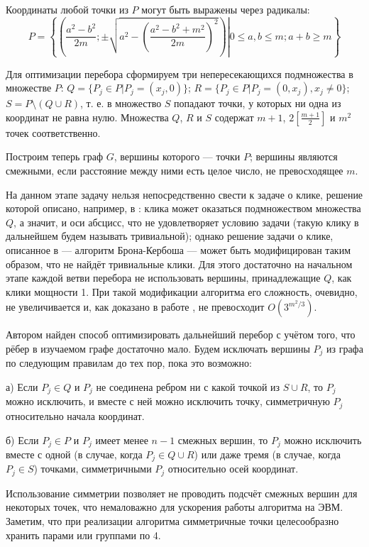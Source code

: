 \documentclass{article}
\begin{document}
Координаты любой точки из $P$ могут быть выражены через радикалы:
$$
	P = \left\{
		\left(\left.  \frac{a^2-b^2}{2m} ; \pm\sqrt{a^2  - \left( \frac{a^2-b^2+m^2}{2m}\right)^2}  \right)	\right| 0 \leq a, b \leq m ; a+b \geq m
	\right\}
$$


Для оптимизации перебора сформируем три непересекающихся подмножества в множестве $P$:
$Q = \{P_j \in P | P_j = (x_j, 0)\}$;
$R = \{P_j \in P | P_j = (0, x_j), x_j \neq 0\}$;
$S = P \setminus \left( Q \cup R\right)$,
т. е. в множество $S$ попадают точки, у которых ни одна из координат не равна нулю.
Множества $Q$, $R$ и $S$ содержат $m+1$, $2\left\lbrack\frac{m+1}{2}\right\rbrack$ и $m^2$ точек соответственно.

Построим теперь граф $G$, вершины которого --- точки $P$;
вершины являются смежными, если расстояние между ними есть целое число, не превосходящее $m$.

На данном этапе задачу нельзя непосредственно свести к задаче о клике, решение которой описано, например, в \cite{BronKerbosh}:
клика может оказаться подмножеством множества $Q$, а значит, и оси абсцисс, что не удовлетворяет условию задачи (такую клику в дальнейшем будем называть тривиальной);
однако решение задачи о клике, описанное в \cite{BronKerbosh} --- алгоритм Брона-Кербоша --- может быть модифицирован таким образом, что не найдёт тривиальные клики.
Для этого достаточно на начальном этапе каждой ветви перебора не использовать вершины, принадлежащие $Q$, как клики мощности 1.
При такой модификации алгоритма его сложность, очевидно, не увеличивается и, как доказано в работе \cite{Tomita}, не превосходит $O(3^{m^2/3})$.


Автором найден способ оптимизировать дальнейший перебор с учётом того, что рёбер в изучаемом графе достаточно мало.
Будем исключать вершины $P_j$ из графа по следующим правилам до тех пор, пока это возможно:

а) Если $P_j \in Q$ и $P_j$ не соединена ребром ни с какой точкой из $S \cup R$, то $P_j$ можно исключить, и вместе с ней можно исключить точку, симметричную $P_j$ относительно начала координат.

б) Если $P_j \in P$ и $P_j$ имеет менее $n-1$ смежных вершин, то $P_j$ можно исключить вместе с одной (в случае, когда $P_j \in Q \cup R$) или даже тремя (в случае, когда $P_j \in S$) точками, симметричными $P_j$ относительно осей координат.

Использование симметрии позволяет не проводить подсчёт смежных вершин для некоторых точек, что немаловажно для ускорения работы алгоритма на ЭВМ.
Заметим, что при реализации алгоритма симметричные точки целесообразно хранить парами или группами по 4.
\end{document}
